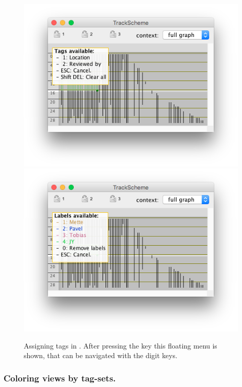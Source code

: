 \begin{figure}
    \centering
    \null\hfill
    \includegraphics[height=0.2\textheight]{figures/Mastodon_ColorByTagSet_2.png}
    \hfill
    \includegraphics[height=0.2\textheight,trim=0.5cm .5cm .5cm .5cm,clip]{figures/Mastodon_ColorByTagSet_3.png}
    \hfill\null
    
    \caption{Assigning tags in \TrackScheme. After pressing the  key this floating menu is shown, that can be navigated with the digit keys.  }
    \label{fig:AssignTagSetShortcut}
\end{figure}



\subsubsection{Coloring views by tag-sets.}


